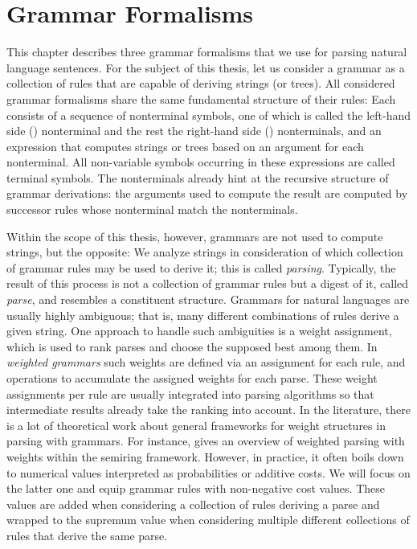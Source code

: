 \documentclass[../document.tex]{subfiles}
\begin{document}
    \chapter{Grammar Formalisms}\label{sec:grammars}
    This chapter describes three grammar formalisms that we use for parsing natural language sentences.
    For the subject of this thesis, let us consider a grammar as a collection of rules that are capable of deriving strings (or trees).
    All considered grammar formalisms share the same fundamental structure of their rules:
        Each consists of a sequence of nonterminal symbols, one of which is called the left-hand side () nonterminal and the rest the right-hand side () nonterminals, and an expression that computes strings or trees based on an argument for each  nonterminal.
        All non-variable symbols occurring in these expressions are called terminal symbols.
    The nonterminals already hint at the recursive structure of grammar derivations: the arguments used to compute the result are computed by successor rules whose  nonterminal match the  nonterminals.

    Within the scope of this thesis, however, grammars are not used to compute strings, but the opposite:
        We analyze strings in consideration of which collection of grammar rules may be used to derive it; this is called \emph{parsing}.
    Typically, the result of this process is not a collection of grammar rules but a digest of it, called \emph{parse}, and resembles a constituent structure.
    Grammars for natural languages are usually highly ambiguous; that is, many different combinations of rules derive a given string.
    One approach to handle such ambiguities is a weight assignment, which is used to rank parses and choose the supposed best among them.
    In \emph{weighted grammars} such weights are defined via an assignment for each rule, and operations to accumulate the assigned weights for each parse.
    These weight assignments per rule are usually integrated into parsing algorithms so that intermediate results already take the ranking into account.
    In the literature, there is a lot of theoretical work about general frameworks for weight structures in parsing with grammars.
    For instance, \citet{Goodman} gives an overview of weighted parsing with weights within the semiring framework.
    However, in practice, it often boils down to numerical values interpreted as probabilities or additive costs.
    We will focus on the latter one and equip grammar rules with non-negative cost values.
    These values are added when considering a collection of rules deriving a parse and wrapped to the supremum value when considering multiple different collections of rules that derive the same parse.
\end{document}
